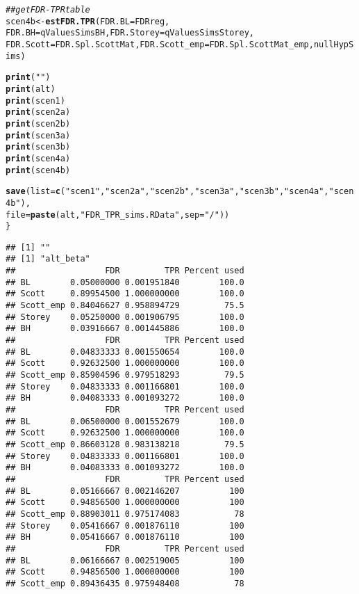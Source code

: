 \documentclass{article}\usepackage[]{graphicx}\usepackage[]{color}
\makeatletter
\newcommand{\hlstr}[1]{\textcolor[rgb]{0.192,0.494,0.8}{#1}}%
\newcommand{\hlcom}[1]{\textcolor[rgb]{0.678,0.584,0.686}{\textit{#1}}}%
\newcommand{\hlstd}[1]{\textcolor[rgb]{0.345,0.345,0.345}{#1}}%
\newcommand{\hlkwb}[1]{\textcolor[rgb]{0.69,0.353,0.396}{#1}}%
\newcommand{\hlkwc}[1]{\textcolor[rgb]{0.333,0.667,0.333}{#1}}%
\newcommand{\hlkwd}[1]{\textcolor[rgb]{0.737,0.353,0.396}{\textbf{#1}}}%
\newenvironment{kframe}{%
 \def\at@end@of@kframe{}%
 \ifinner\ifhmode%
  \def\at@end@of@kframe{\end{minipage}}%
  \begin{minipage}{\columnwidth}%
 \fi\fi%
 \def\FrameCommand##1{\hskip\@totalleftmargin \hskip-\fboxsep
 \colorbox{shadecolor}{##1}\hskip-\fboxsep
     \hskip-\linewidth \hskip-\@totalleftmargin \hskip\columnwidth}%
 \MakeFramed {\advance\hsize-\width
   \@totalleftmargin\z@ \linewidth\hsize
   \@setminipage}}%
 {\par\unskip\endMakeFramed%
 \at@end@of@kframe}
\newenvironment{knitrout}{}{} %
\makeatother
\begin{document}
\begin{knitrout}
\begin{kframe}
\begin{alltt}
  \hlcom{##get FDR-TPR table}
  \hlstd{scen4b} \hlkwb{<-} \hlkwd{estFDR.TPR}\hlstd{(}\hlkwc{FDR.BL} \hlstd{= FDRreg,}
                       \hlkwc{FDR.BH} \hlstd{= qValuesSimsBH,} \hlkwc{FDR.Storey} \hlstd{= qValuesSimsStorey,}
                       \hlkwc{FDR.Scott} \hlstd{= FDR.Spl.ScottMat,} \hlkwc{FDR.Scott_emp} \hlstd{= FDR.Spl.ScottMat_emp, nullHypSims)}

  \hlkwd{print}\hlstd{(}\hlstr{""}\hlstd{)}
  \hlkwd{print}\hlstd{(alt)}
  \hlkwd{print}\hlstd{(scen1)}
  \hlkwd{print}\hlstd{(scen2a)}
  \hlkwd{print}\hlstd{(scen2b)}
  \hlkwd{print}\hlstd{(scen3a)}
  \hlkwd{print}\hlstd{(scen3b)}
  \hlkwd{print}\hlstd{(scen4a)}
  \hlkwd{print}\hlstd{(scen4b)}

  \hlkwd{save}\hlstd{(}\hlkwc{list}\hlstd{=}\hlkwd{c}\hlstd{(}\hlstr{"scen1"}\hlstd{,}\hlstr{"scen2a"}\hlstd{,}\hlstr{"scen2b"}\hlstd{,}\hlstr{"scen3a"}\hlstd{,}\hlstr{"scen3b"}\hlstd{,}\hlstr{"scen4a"}\hlstd{,}\hlstr{"scen4b"}\hlstd{),}
       \hlkwc{file}\hlstd{=}\hlkwd{paste}\hlstd{(alt,}\hlstr{"FDR_TPR_sims.RData"}\hlstd{,}\hlkwc{sep}\hlstd{=}\hlstr{"/"}\hlstd{))}
\hlstd{\}}
\end{alltt}
\begin{verbatim}
## [1] ""
## [1] "alt_beta"
##                  FDR         TPR Percent used
## BL        0.05000000 0.001951840        100.0
## Scott     0.89954500 1.000000000        100.0
## Scott_emp 0.84046627 0.958894729         75.5
## Storey    0.05250000 0.001906795        100.0
## BH        0.03916667 0.001445886        100.0
##                  FDR         TPR Percent used
## BL        0.04833333 0.001550654        100.0
## Scott     0.92632500 1.000000000        100.0
## Scott_emp 0.85904596 0.979518293         79.5
## Storey    0.04833333 0.001166801        100.0
## BH        0.04083333 0.001093272        100.0
##                  FDR         TPR Percent used
## BL        0.06500000 0.001552679        100.0
## Scott     0.92632500 1.000000000        100.0
## Scott_emp 0.86603128 0.983138218         79.5
## Storey    0.04833333 0.001166801        100.0
## BH        0.04083333 0.001093272        100.0
##                  FDR         TPR Percent used
## BL        0.05166667 0.002146207          100
## Scott     0.94856500 1.000000000          100
## Scott_emp 0.88903011 0.975174083           78
## Storey    0.05416667 0.001876110          100
## BH        0.05416667 0.001876110          100
##                  FDR         TPR Percent used
## BL        0.06166667 0.002519005          100
## Scott     0.94856500 1.000000000          100
## Scott_emp 0.89436435 0.975948408           78

\end{verbatim}
\end{kframe}
\end{knitrout}
\end{document}
